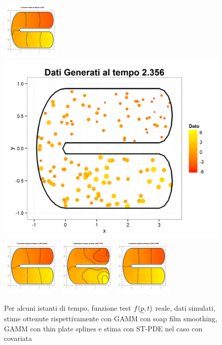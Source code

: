 \documentclass[a4paper,11pt,twoside,openright]{book}							%
\begin{document}
\begin{landscape}
\begin{figure}
\includegraphics[width=0.25\textwidth]{immagini/simulazioni_covar/REALEtempo4.png}
\includegraphics[height=0.25\textwidth]{immagini/simulazioni_covar/Dati_tempo4.png}
\includegraphics[width=0.25\textwidth]{immagini/simulazioni_covar/SOAPtempo4.png}
\includegraphics[width=0.25\textwidth]{immagini/simulazioni_covar/TPStempo4.png}
\includegraphics[width=0.25\textwidth]{immagini/simulazioni_covar/STSRtempo4.png}

\caption{Per alcuni istanti di tempo, funzione test $f(\protect\underline{p},t)$ reale, dati simulati, stime ottenute rispettivamente con GAMM con soap film smoothing, GAMM con thin plate splines e stima con ST-PDE nel caso con covariata}
\label{fig:confronto_altri_metodi_cov}
\end{figure}
\end{landscape}
\end{document}

